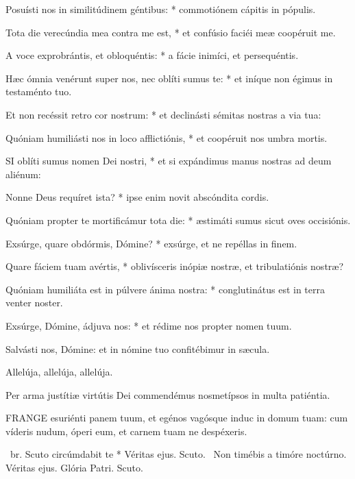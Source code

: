 Posuísti nos in similitúdinem géntibus: * commotiónem cápitis in pópulis.

Tota die verecúndia mea contra me est, * et confúsio faciéi meæ coopéruit me.

A voce exprobrántis, et obloquéntis: * a fácie inimíci, et persequéntis.

Hæc ómnia venérunt super nos, nec oblíti sumus te: * et iníque non égimus in testaménto tuo.

Et non recéssit retro cor nostrum: * et declinásti sémitas nostras a via tua:

Quóniam humiliásti nos in loco afflictiónis, * et coopéruit nos umbra mortis.


\lettrine[lines=2]{S}{I} oblíti sumus nomen Dei nostri, * et si expándimus manus nostras ad deum aliénum:

Nonne Deus requíret ista? * ipse enim novit abscóndita cordis.

Quóniam propter te mortificámur tota die: * æstimáti sumus sicut oves occisiónis.

Exsúrge, quare obdórmis, Dómine? * exsúrge, et ne repéllas in finem.

Quare fáciem tuam avértis, * oblivísceris inópiæ nostræ, et tribulatiónis nostræ?

Quóniam humiliáta est in púlvere ánima nostra: * conglutinátus est in terra venter noster.

Exsúrge, Dómine, ádjuva nos: * et rédime nos propter nomen tuum.

  Salvásti nos, Dómine: et in nómine tuo confitébimur in sæcula.

  Allelúja, allelúja, allelúja.



 Per arma justítiæ virtútis Dei commendémus nosmetípsos in multa patiéntia.


\lettrine[lines=2]{F}{RANGE} esuriénti panem tuum, et egénos vagósque induc in domum tuam: cum víderis nudum, óperi eum, et carnem tuam ne despéxeris.

\R\ br. Scuto circúmdabit te * Véritas ejus. Scuto. \V\ Non timébis a timóre noctúrno. Véritas ejus. Glória Patri. Scuto.

